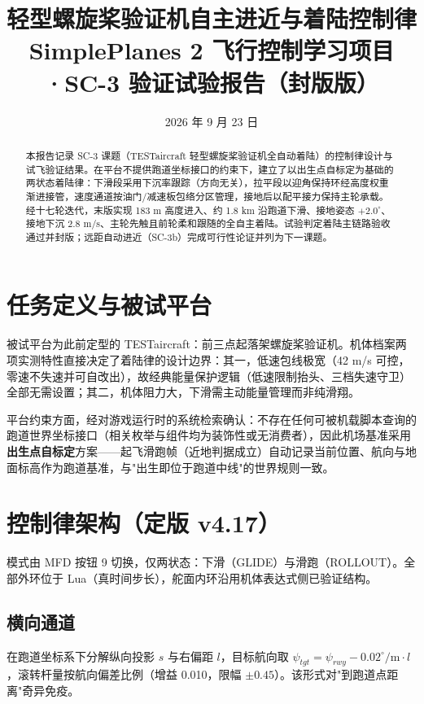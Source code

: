 \documentclass[12pt,UTF8,a4paper]{ctexart}
\title{\textbf{轻型螺旋桨验证机自主进近与着陆控制律}\\[0.5em]
\large SimplePlanes 2 飞行控制学习项目·SC-3 验证试验报告（封版版）}
\author{}
\date{2026 年 9 月 23 日}
\begin{document}
\maketitle
\thispagestyle{empty}

\begin{abstract}
本报告记录 SC-3 课题（TESTaircraft 轻型螺旋桨验证机全自动着陆）的控制律设计与试飞验证结果。在平台不提供跑道坐标接口的约束下，建立了以出生点自标定为基础的两状态着陆律：下滑段采用下沉率跟踪（方向无关），拉平段以迎角保持环经高度权重渐进接管，速度通道按油门/减速板包络分区管理，接地后以配平接力保持主轮承载。经十七轮迭代，末版实现 183 m 高度进入、约 1.8 km 沿跑道下滑、接地姿态 $+2.0^\circ$、接地下沉 2.8 m/s、主轮先触且前轮柔和跟随的全自主着陆。试验判定着陆主链路验收通过并封版；远距自动进近（SC-3b）完成可行性论证并列为下一课题。
\end{abstract}

\section{任务定义与被试平台}
被试平台为此前定型的 TESTaircraft：前三点起落架螺旋桨验证机。机体档案两项实测特性直接决定了着陆律的设计边界：其一，低速包线极宽（42 m/s 可控，零速不失速并可自改出），故经典能量保护逻辑（低速限制抬头、三档失速守卫）全部无需设置；其二，机体阻力大，下滑需主动能量管理而非纯滑翔。

平台约束方面，经对游戏运行时的系统检索确认：不存在任何可被机载脚本查询的跑道世界坐标接口（相关枚举与组件均为装饰性或无消费者），因此机场基准采用\textbf{出生点自标定}方案——起飞滑跑帧（近地判据成立）自动记录当前位置、航向与地面标高作为跑道基准，与"出生即位于跑道中线"的世界规则一致。

\section{控制律架构（定版 v4.17）}
模式由 MFD 按钮 9 切换，仅两状态：下滑（GLIDE）与滑跑（ROLLOUT）。全部外环位于 Lua（真时间步长），舵面内环沿用机体表达式侧已验证结构。

\subsection{横向通道}
在跑道坐标系下分解纵向投影 $s$ 与右偏距 $l$，目标航向取 $\psi_{tgt} = \psi_{rwy} - 0.02^\circ/\mathrm{m}\cdot l$，滚转杆量按航向偏差比例（增益 0.010，限幅 $\pm0.45$）。该形式对"到跑道点距离"奇异免疫。
\end{document}
